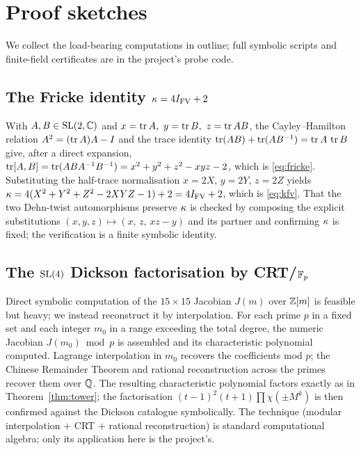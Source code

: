\appendix

\section{Proof sketches}
\label{app:proofs}

We collect the load-bearing computations in outline; full symbolic scripts and
finite-field certificates are in the project's probe code.

\subsection{The Fricke identity \texorpdfstring{$\kappa=4I_{\mathrm{FV}}+2$}{kappa = 4 I + 2}}
\label{app:kappa}

With $A,B\in\mathrm{SL}(2,\mathbb{C})$ and $x=\operatorname{tr} A,\ y=\operatorname{tr} B,\ z=\operatorname{tr} AB$, the Cayley--Hamilton relation
$A^2=(\operatorname{tr} A)A-I$ and the trace identity $\operatorname{tr}(AB)+\operatorname{tr}(AB^{-1})=\operatorname{tr} A\,\operatorname{tr} B$ give, after a
direct expansion, $\operatorname{tr}[A,B]=\operatorname{tr}(ABA^{-1}B^{-1})=x^2+y^2+z^2-xyz-2$, which is
\eqref{eq:fricke}. Substituting the half-trace normalisation $x=2X,\,y=2Y,\,z=2Z$ yields
$\kappa=4(X^2+Y^2+Z^2-2XYZ-1)+2=4I_{\mathrm{FV}}+2$, which is \eqref{eq:kfv}. That the two
Dehn-twist automorphisms preserve $\kappa$ is checked by composing the explicit substitutions
$(x,y,z)\mapsto(x,\,z,\,xz-y)$ and its partner and confirming $\kappa$ is fixed; the
verification is a finite symbolic identity.

\subsection{The $\mathrm{SL}(4)$ Dickson factorisation by CRT/$\mathbb{F}_p$}
\label{app:crt}

Direct symbolic computation of the $15\times15$ Jacobian $J(m)$ over $\mathbb{Z}[m]$ is feasible
but heavy; we instead reconstruct it by interpolation. For each prime $p$ in a fixed set
and each integer $m_0$ in a range exceeding the total degree, the numeric Jacobian
$J(m_0)\bmod p$ is assembled and its characteristic polynomial computed. Lagrange
interpolation in $m_0$ recovers the coefficients mod $p$; the Chinese Remainder Theorem
and rational reconstruction across the primes recover them over $\mathbb{Q}$. The resulting
characteristic polynomial factors exactly as in Theorem~\ref{thm:tower}; the factorisation
$(t-1)^2(t+1)\prod\chi(\pm M^k)$ is then confirmed against the Dickson catalogue
symbolically. The technique (modular interpolation $+$ CRT $+$ rational reconstruction) is
standard computational algebra; only its application here is the project's.

